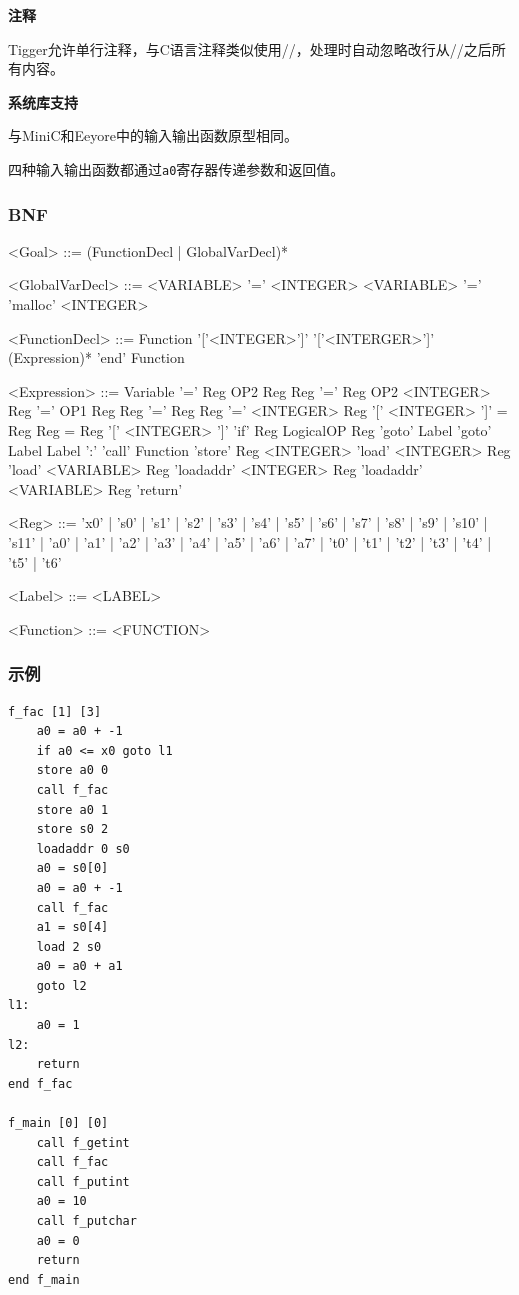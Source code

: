 \noindent \textbf{注释}

Tigger允许单行注释，与C语言注释类似使用//，处理时自动忽略改行从//之后所有内容。

\noindent \textbf{系统库支持}

与MiniC和Eeyore中的输入输出函数原型相同。

四种输入输出函数都通过\texttt{a0}寄存器传递参数和返回值。

\newpage
\subsubsection{BNF}
\setlength{\grammarindent}{8em} %
\begin{typewriterfont}
\begin{grammar}
<Goal>  ::= (FunctionDecl | GlobalVarDecl)*

<GlobalVarDecl> ::= <VARIABLE> '=' <INTEGER>
\alt <VARIABLE> '=' 'malloc' <INTEGER>

<FunctionDecl> ::= Function '['<INTEGER>']' '['<INTERGER>']' (Expression)* 'end' Function

<Expression>	::=	Variable '=' Reg OP2 Reg
\alt Reg '=' Reg OP2 <INTEGER>
\alt Reg '=' OP1 Reg
\alt Reg '=' Reg
\alt Reg '=' <INTEGER>
\alt Reg '[' <INTEGER> ']' = Reg
\alt Reg = Reg '[' <INTEGER> ']'
\alt 'if' Reg LogicalOP Reg 'goto' Label
\alt 'goto' Label
\alt Label ':'
\alt 'call' Function
\alt 'store' Reg <INTEGER>
\alt 'load' <INTEGER> Reg
\alt 'load' <VARIABLE> Reg
\alt 'loadaddr' <INTEGER> Reg
\alt 'loadaddr' <VARIABLE> Reg
\alt 'return'

<Reg> ::= 'x0'
| 's0'
| 's1'
| 's2'
| 's3'
| 's4'
| 's5'
| 's6'
| 's7'
| 's8'
| 's9'
| 's10'
| 's11'
| 'a0'
| 'a1'
| 'a2'
| 'a3'
| 'a4'
| 'a5'
| 'a6'
| 'a7'
| 't0'
| 't1'
| 't2'
| 't3'
| 't4'
| 't5'
| 't6'

<Label> ::= <LABEL>

<Function> ::= <FUNCTION>

\end{grammar}
\end{typewriterfont}

\newpage
\subsubsection{示例}
\begin{typewriterfont}
\begin{lstlisting}
f_fac [1] [3]
    a0 = a0 + -1
    if a0 <= x0 goto l1
    store a0 0
    call f_fac
    store a0 1
    store s0 2
    loadaddr 0 s0
    a0 = s0[0]
    a0 = a0 + -1
    call f_fac
    a1 = s0[4]
    load 2 s0
    a0 = a0 + a1
    goto l2
l1:
    a0 = 1
l2:
    return
end f_fac

f_main [0] [0]
    call f_getint
    call f_fac
    call f_putint
    a0 = 10
    call f_putchar
    a0 = 0
    return
end f_main
\end{lstlisting}
\end{typewriterfont}

